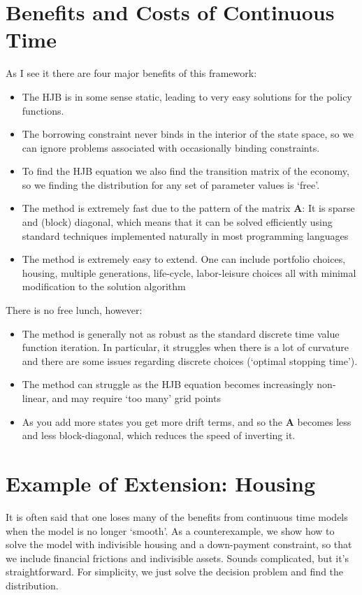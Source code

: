 \documentclass[12pt]{article}
\DeclareMathOperator{\1}{\mathbbm{1}}
\begin{document}
\section{Benefits and Costs of Continuous Time}
As I see it there are four major benefits of this framework:
\begin{itemize}
\item The HJB is in some sense static, leading to very easy solutions for the policy functions.
\item The borrowing constraint never binds in the interior of the state space, so we can ignore problems associated with occasionally binding constraints.
\item To find the HJB equation we also find the transition matrix of the economy, so we finding the distribution for any set of parameter values is `free'.
\item The method is extremely fast due to the pattern of the matrix $\mathbf{A}$: It is sparse and (block) diagonal, which means that it can be solved efficiently using standard techniques implemented naturally in most programming languages
\item The method is extremely easy to extend. One can include portfolio choices, housing, multiple generations, life-cycle, labor-leisure choices all with minimal modification to the solution algorithm
\end{itemize}

There is no free lunch, however:
\begin{itemize}
\item The method is generally not as robust as the standard discrete time value function iteration. In particular, it struggles when there is a lot of curvature and there are some issues regarding discrete choices (`optimal stopping time').
\item The method can struggle as the HJB equation becomes increasingly non-linear, and may require `too many' grid points
\item As you add more states you get more drift terms, and so the $\mathbf{A}$ becomes less and less block-diagonal, which reduces the speed of inverting it.
\end{itemize}

\section{Example of Extension: Housing}
It is often said that one loses many of the benefits from continuous time models when the model is no longer `smooth'. As a counterexample, we show how to solve the model with indivisible housing and a down-payment constraint, so that we include financial frictions and indivisible assets. Sounds complicated, but it's straightforward. For simplicity, we just solve the decision problem and find the distribution.
\end{document}

